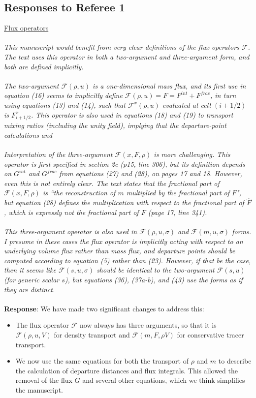 \documentclass[11pt,a4paper]{article}
\begin{document}
\subsection*{Responses to Referee 1}
\underline{Flux operators} \\
\\
\textit{This manuscript would benefit from very clear definitions of the flux operators $\mathcal{F}$.  The text uses this operator in both a two-argument and three-argument form, and both are defined implicitly.  \\
\\
The two-argument $\mathcal{F}(\rho,u)$ is a one-dimensional mass flux, and its first use in equation (16) seems to implicitly define $\mathcal{F}(\rho,u) = F = F^{int} + F^{frac}$, in turn using equations (13) and (14), such that $\mathcal{F}^{x}(\rho,u)$ evaluated at cell $(i+1/2)$ is $F^x_{i+1/2}$.  This operator is also used in equations (18) and (19) to transport mixing ratios (including the unity field), implying that the departure-point calculations and \\
\\
Interpretation of the three-argument $\mathcal{F}(x,F,\rho)$ is more challenging.  This operator is first specified in section 2c (p15, line 306), but its definition depends on $G^{int}$ and $G^{frac}$ from equations (27) and (28), on pages 17 and 18.  However, even this is not entirely clear.  The text states that the fractional part of $\mathcal{F}(x,F,\rho)$ is ``the reconstruction of $m$ multiplied by the fractional part of $F$", but equation (28) defines the multiplication with respect to the fractional part of $\hat{F}$, which is expressly not the fractional part of $F$ (page 17, line 341). \\
\\
This three-argument operator is also used in $\mathcal{F}(\rho,u,\sigma)$ and $\mathcal{F}(m,u,\sigma)$ forms.  I presume in these cases the flux operator is implicitly acting with respect to an underlying volume flux rather than mass flux, and departure points should be computed according to equation (5) rather than (23). However, if that be the case, then it seems like $\mathcal{F}(s,u,\sigma)$ should be identical to the two-argument $\mathcal{F}(s,u)$ (for generic scalar $s$), but equations (36), (37a-b), and (43) use the forms as if they are distinct.} \\
\\
\textbf{Response}: We have made two significant changes to address this:
\begin{itemize}
    \item The flux operator $\mathcal{F}$ now always has three arguments, so that it is $\mathcal{F}(\rho,u,V)$ for density transport and $\mathcal{F}(m,F,\rho V)$ for conservative tracer transport.
    \item We now use the same equations for both the transport of $\rho$ and $m$ to describe the calculation of departure distances and flux integrals. This allowed the removal of the flux $G$ and several other equations, which we think simplifies the manuscript.
\end{itemize}
\end{document}
